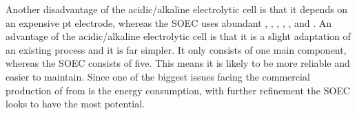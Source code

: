 Another disadvantage of the acidic/alkaline electrolytic cell is that it depends on an expensive pt electrode, whereas the SOEC uses abundant , , , , ,  and .
An advantage of the acidic/alkaline electrolytic cell is that it is a slight adaptation of an existing process and it is far simpler.
It only consists of one main component, whereas the SOEC consists of five.
This means it is likely to be more reliable and easier to maintain.
Since one of the biggest issues facing the commercial production of  from  is the energy consumption, with further refinement the SOEC looks to have the most potential.


